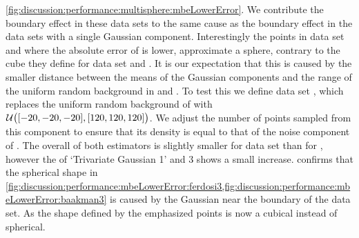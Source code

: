 		\cref{fig:discussion:performance:multisphere:mbeLowerError}. We contribute the boundary effect in these data sets to the same cause as the boundary effect in the data sets with a single Gaussian component. Interestingly the points in data set \ferdosiThree and \baakmanThree where the absolute error of \mbe is lower, approximate a sphere, contrary to the cube they define for data set \ferdosiTwo and \baakmanTwo. It is our expectation that this is caused by the smaller distance between the means of the Gaussian components and the range of the uniform random background in \ferdosiThree and \baakmanThree.
			To test this we define data set \ferdosiThreeNoise, which replaces the uniform random background of \ferdosiThree with $\mathcal{U}\big([-20, -20, -20], [120, 120, 120]\big)$. We adjust the number of points sampled from this component to ensure that its density is equal to that of the noise component of \ferdosiThree.
			The overall \mse of both estimators is slightly smaller for data set \ferdosiThreeNoise than for \ferdosiThree, however the \mse of `Trivariate Gaussian 1' and 3 shows a small increase. 
			 confirms that the spherical shape in \cref{fig:discussion:performance:mbeLowerError:ferdosi3,fig:discussion:performance:mbeLowerError:baakman3} is caused by the Gaussian near the boundary of the data set. As the shape defined by the emphasized points is now a cubical instead of spherical. 
